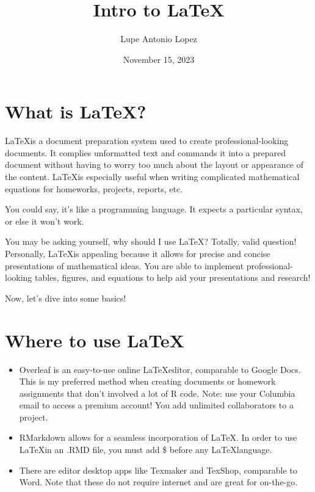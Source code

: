 \documentclass[11pt]{article}
\title{Intro to \LaTeX}
\author{Lupe Antonio Lopez}
\date{November 15, 2023}
\begin{document}
\maketitle

\section{What is \LaTeX?}

\LaTeX is a document preparation system used to create professional-looking documents. It complies unformatted text and commands it into a prepared document without having to worry too much about the layout or appearance of the content. \LaTeX is especially useful when writing complicated mathematical equations for homeworks, projects, reports, etc. 

\noindent You could say, it's like a programming language. It expects a particular syntax, or else it won't work. 

\noindent You may be asking yourself, why should I use \LaTeX? Totally, valid question! Personally, \LaTeX is appealing because it allows for precise and concise presentations of mathematical ideas. You are able to implement professional-looking tables, figures, and equations to help aid your presentations and research! 

Now, let's dive into some basics!

\section{Where to use \LaTeX}

\begin{itemize}
    \item Overleaf is an easy-to-use online \LaTeX editor, comparable to Google Docs. This is my preferred method when creating documents or homework assignments that don't involved a lot of R code. Note: use your Columbia email to access a premium account! You add unlimited collaborators to a project. 

    \item RMarkdown allows for a seamless incorporation of \LaTeX. In order to use \LaTeX in an .RMD file, you must add \$ before any \LaTeX language.

    \item There are editor desktop apps like Texmaker and TexShop, comparable to Word. Note that these do not require internet and are great for on-the-go. 
\end{itemize}
\end{document}

